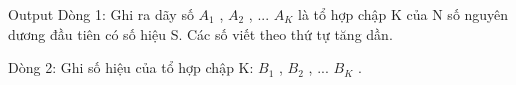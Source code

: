 Output
Dòng 1: Ghi ra dãy số $A_{1}$ , $A_{2}$ , ... $A_{K}$ là tổ hợp chập K của N số nguyên dương đầu tiên có số hiệu S. Các số viết theo thứ tự tăng dần.

Dòng 2: Ghi số hiệu của tổ hợp chập K: $B_{1}$ , $B_{2}$ , ... $B_{K}$ .